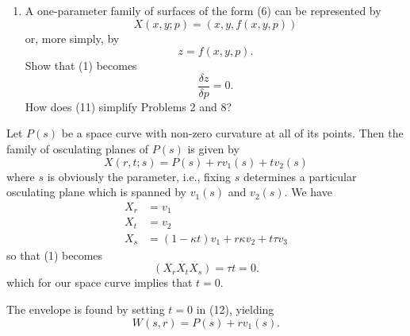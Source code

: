 \documentclass{book}
\begin{document}
\begin{enumerate}[1.]
\begin{equation}
      X(x,y) = (x, y, f(x,y))
    \end{equation}
    i.e., to use $x$ and $y$ as intrinsic coordinates. Calculate $E$, $F$, $G$, $L$, $M$, $N$, etc. from (6) and show that the area element is the familiar one used in multivariable calculus,
    \begin{equation}
      dA = \sqrt{ 1 + f_{x}^{2} + f_{y}^{2} } dx dy.
    \end{equation}
    Show that (6) is a developable surface if and only if
    \begin{equation}
      f_{xx} f_{yy} - f_{xy}^{2} = 0
    \end{equation}
    at all of its points. Explain how the left side expression in (8) is used to identify critical points as relative extrema or saddle points in advanced calculus.
  \item A one-parameter family of surfaces of the form (6) can be represented by
    \begin{equation}
      X(x,y;p) = (x, y, f(x,y,p))
    \end{equation}
    or, more simply, by
    \begin{equation}
      z = f(x,y,p).
    \end{equation}
    Show that (1) becomes
    \begin{equation}
      \frac{\delta z}{\delta p} = 0.
    \end{equation}
    How does (11) simplify Problems 2 and 8?
\end{enumerate}

Let $P(s)$ be a space curve with non-zero curvature at all of its points. Then the family of osculating planes of $P(s)$ is given by
\begin{equation}
X(r,t;s) = P(s) + rv_{1}(s) + tv_{2}(s)
\end{equation}
where $s$ is obviously the parameter, i.e., fixing $s$ determines a particular osculating plane which is spanned by $v_{1}(s)$ and $v_{2}(s)$. We have
\begin{align*}
X_{r} & = v_{1} \\
X_{t} & = v_{2} \\
X_{s} & = (1 - \kappa t) v_{1} + r \kappa v_{2} + t \tau v_{3}
\end{align*}
so that (1) becomes
\begin{equation}
(X_{r} X_{t} X_{s}) = \tau t = 0.
\end{equation}
which for our space curve implies that $t = 0$.

The envelope is found by setting $t = 0$ in (12), yielding
\begin{equation}
W(s,r) = P(s) + rv_{1}(s).
\end{equation}
\end{document}
